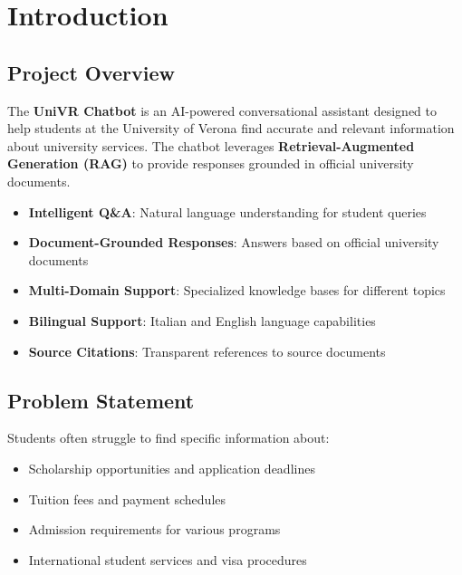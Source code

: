 \documentclass[12pt,a4paper]{article}
\begin{document}
\section{Introduction}

\subsection{Project Overview}

The \textbf{UniVR Chatbot} is an AI-powered conversational assistant designed to help students at the University of Verona find accurate and relevant information about university services. The chatbot leverages \textbf{Retrieval-Augmented Generation (RAG)} to provide responses grounded in official university documents.

\begin{tcolorbox}[colback=univrbg, colframe=univrred, title=\textbf{Key Features}]
    \begin{itemize}[noitemsep]
        \item \textbf{Intelligent Q\&A}: Natural language understanding for student queries
        \item \textbf{Document-Grounded Responses}: Answers based on official university documents
        \item \textbf{Multi-Domain Support}: Specialized knowledge bases for different topics
        \item \textbf{Bilingual Support}: Italian and English language capabilities
        \item \textbf{Source Citations}: Transparent references to source documents
    \end{itemize}
\end{tcolorbox}

\subsection{Problem Statement}

Students often struggle to find specific information about:
\begin{itemize}
    \item Scholarship opportunities and application deadlines
    \item Tuition fees and payment schedules
    \item Admission requirements for various programs
    \item International student services and visa procedures
\end{itemize}
\end{document}
